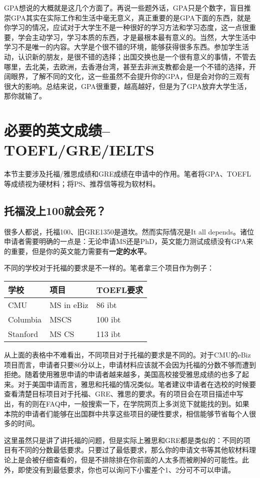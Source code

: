 GPA想说的大概就是这几个方面了。再说一些题外话，GPA只是个数字，盲目推崇GPA其实在实际工作和生活中毫无意义，真正重要的是GPA下面的东西，就是你学习的情况，应试对于大学生不是一种很好的学习方法和学习态度，这一点很重要，学会主动学习，学习本质的东西，才是最根本最有意义的。当然，大学生活中学习不是唯一的内容。大学是个很不错的环境，能够获得很多东西。参加学生活动，认识新的朋友，是很不错的选择；出国交换也是一个很有意义的事情，不管去哪里，去北美，去欧洲，去香港台湾，甚至去非洲支教都会是一个不错的选择，开阔眼界，了解不同的文化，这一些虽然不会提升你的GPA，但是会对你的三观有很大的影响。总结来说，GPA很重要，越高越好，但是为了GPA放弃大学生活，那你就输了。

\section{必要的英文成绩--TOEFL/GRE/IELTS}
本节主要涉及托福/雅思成绩和GRE成绩在申请中的作用。笔者将GPA、TOEFL等成绩视为硬材料；将PS、推荐信等视为软材料。
\subsection{托福没上100就会死？}
很多人都说，托福100、旧GRE1350是道坎。然而实际情况是It all depends。诸位申请者需要明确的一点是：无论申请MS还是PhD，英文能力测试成绩没有GPA来的重要，但是你的英文能力需要有\textbf{一定的水平}。\par
不同的学校对于托福的要求是不一样的。笔者拿三个项目作为例子：
\begin{center}
\begin{tabular}{|l|l|l|}
\hline
学校 & 项目 & TOEFL要求\\ \hline
CMU & MS in eBiz & 86 ibt\\
Columbia & MSCS & 100 ibt\\
Stanford & MS CS & 113 ibt\\ \hline
\end{tabular}
\end{center}\par

从上面的表格中不难看出，不同项目对于托福的要求是不同的。对于CMU的eBiz项目而言，申请者只要86分以上，申请材料应该就不会因为托福的分数不够而遭到拒绝。随着使用雅思申请的申请者越来越多，美国高校接受雅思成绩的也多了起来。对于美国申请而言，雅思和托福的情况类似。笔者建议申请者在选校的时候要查看清楚目标项目对于托福、GRE、雅思的要求。有的项目会在项目描述中写出，有的则在FAQ中，一般搜索一下，在学院网页上多浏览下就能找的到。如果本院的申请者们能够在出国群中共享这些项目的硬性要求，相信能够节省每个人很多的时间。\par
这里虽然只是讲了讲托福的问题，但是实际上雅思和GRE都是类似的：不同的项目有不同的分数最低要求。只要过了最低要求，那么你的申请文书等其他软材料理论上是会被仔细查看的，但是不排除排在你前面的人太多而被刷掉的可能性。此外，即使没有到最低要求，你也可以询问下小蜜差个1、2分可不可以申请。\par

